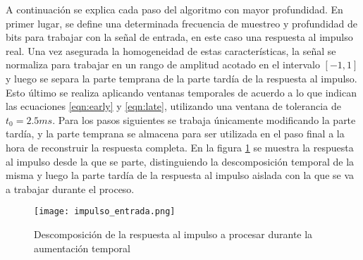 A continuación se explica cada paso del algoritmo con mayor profundidad.
En primer lugar, se define una determinada frecuencia de muestreo y profundidad de bits para trabajar con la señal de entrada, en este caso una respuesta al impulso real. Una vez asegurada la homogeneidad de estas características, la señal se normaliza para trabajar en un rango de amplitud acotado en el intervalo $[-1,1]$ y luego se separa la parte temprana de la parte tardía de la respuesta al impulso. Esto último se realiza aplicando ventanas temporales de acuerdo a lo que indican las ecuaciones \ref{eqn:early} y \ref{eqn:late}, utilizando una ventana de tolerancia de $t_{0} = 2.5 ms$. Para los pasos siguientes se trabaja únicamente modificando la parte tardía, y la parte temprana se almacena para ser utilizada en el paso final a la hora de reconstruir la respuesta completa. En la figura \ref{fig:impulso_entrada} se  muestra la respuesta al impulso desde la que se parte, distinguiendo la descomposición temporal de la misma y luego la parte tardía de la respuesta al impulso aislada con la que se va a trabajar durante el proceso.

\begin{figure}[H]
	\centering{}
	\texttt{[image: impulso\_entrada.png]}
	\caption{Descomposición de la respuesta al impulso a procesar durante la aumentación temporal}
	\label{fig:impulso_entrada}
\end{figure}

